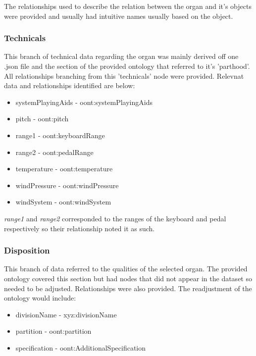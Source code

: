 The relationships used to describe the relation between the organ and it's objects were provided and usually had intuitive names usually based on the object. 

\subsubsection{Technicals}
\hspace*{0.5cm} This branch of technical data regarding the organ was mainly derived off one .json file and the section of the provided ontology that referred to it's 'parthood'. All relationships branching from this 'technicals' node were provided. Relevnat data and relationships identified are below:

\begin{itemize}
    \itemsep0em 
    \item systemPlayingAids - oont:systemPlayingAids
    \item pitch - oont:pitch
    \item range1 -  oont:keyboardRange
    \item range2 - oont:pedalRange
    \item temperature - oont:temperature
    \item windPressure - oont:windPressure
    \item windSystem - oont:windSystem
\end{itemize}

\textit{range1} and \textit{range2} corresponded to the ranges of the keyboard and pedal respectively so their relationship noted it as such. 

\subsubsection{Disposition}
\hspace*{0.5cm} This branch of data referred to the qualities of the selected organ. The provided ontology covered this section but had nodes that did not appear in the dataset so needed to be adjusted. Relationships were also provided. The readjustment of the ontology would include:

\begin{itemize}
    \itemsep0em 
    \item divisionName - xyz:divisionName
    \item partition - oont:partition
    \item specification - oont:AdditionalSpecification
\end{itemize}

